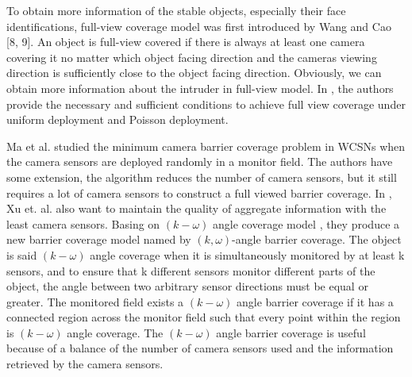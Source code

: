 \documentclass[3p]{elsarticle}
\begin{document}
%
To obtain more information of the stable objects, especially their face identifications, full-view coverage model was first introduced by Wang and Cao [8, 9]. An object is full-view covered if there is always at least one camera covering it no matter which object facing direction and the cameras viewing direction is sufficiently close to the object facing direction. Obviously, we can obtain more information about the intruder in full-view model. In \cite{wu2012achieving}, the authors provide the necessary and sufficient conditions to achieve full view coverage under uniform deployment and Poisson deployment. \par
%
Ma et al. \cite{ma2012minimum} studied the minimum camera barrier coverage problem in WCSNs when the camera sensors are deployed randomly in a monitor field. The authors have some extension, the algorithm reduces the number of camera sensors, but it still requires a lot of camera sensors to construct a full viewed barrier coverage. In \cite{xu2016minimum}, Xu et. al. also want to maintain the quality of aggregate information with the least camera sensors. Basing on $(k-\omega)$ angle coverage model \cite{tseng2012k}, they produce a new barrier coverage model named by $(k, \omega)$-angle barrier coverage. The object is said $(k-\omega)$ angle coverage when it is simultaneously monitored by at least k sensors, and to ensure that k different sensors monitor different parts of the object, the angle between two arbitrary sensor directions must be equal or greater. The monitored field exists a $(k-\omega)$ angle barrier coverage if it has a connected region across the monitor field such that every point within the region is $(k-\omega)$ angle coverage. The $(k-\omega)$ angle barrier coverage is useful because of a balance of the number of camera sensors used and the information retrieved by the camera sensors.\par
%
\end{document}
